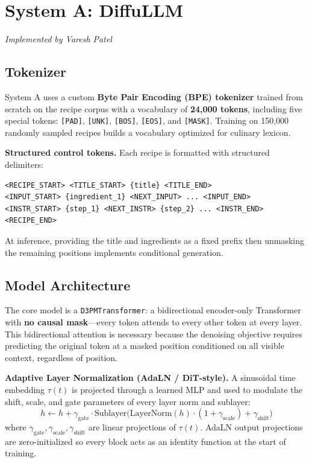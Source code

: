 \documentclass[11pt,a4paper]{article}
\begin{document}
\section{System A: DiffuLLM}

\textit{Implemented by Varesh Patel}

\subsection{Tokenizer}

System A uses a custom \textbf{Byte Pair Encoding (BPE) tokenizer} trained from scratch on the recipe corpus with a vocabulary of \textbf{24,000 tokens}, including five special tokens: \texttt{[PAD]}, \texttt{[UNK]}, \texttt{[BOS]}, \texttt{[EOS]}, and \texttt{[MASK]}. Training on 150,000 randomly sampled recipes builds a vocabulary optimized for culinary lexicon.

\textbf{Structured control tokens.} Each recipe is formatted with structured delimiters:
\begin{lstlisting}
<RECIPE_START> <TITLE_START> {title} <TITLE_END>
<INPUT_START> {ingredient_1} <NEXT_INPUT> ... <INPUT_END>
<INSTR_START> {step_1} <NEXT_INSTR> {step_2} ... <INSTR_END>
<RECIPE_END>
\end{lstlisting}
At inference, providing the title and ingredients as a fixed prefix then unmasking the remaining positions implements conditional generation.

\subsection{Model Architecture}

The core model is a \texttt{D3PMTransformer}: a bidirectional encoder-only Transformer with \textbf{no causal mask}---every token attends to every other token at every layer. This bidirectional attention is necessary because the denoising objective requires predicting the original token at a masked position conditioned on all visible context, regardless of position.

\textbf{Adaptive Layer Normalization (AdaLN / DiT-style).} A sinusoidal time embedding $\tau(t)$ is projected through a learned MLP and used to modulate the shift, scale, and gate parameters of every layer norm and sublayer:
\[
  h \leftarrow h + \gamma_\text{gate} \cdot \mathrm{Sublayer}\!\bigl(\mathrm{LayerNorm}(h)\cdot(1 + \gamma_\text{scale}) + \gamma_\text{shift}\bigr)
\]
where $\gamma_\text{gate}, \gamma_\text{scale}, \gamma_\text{shift}$ are linear projections of $\tau(t)$. AdaLN output projections are zero-initialized so every block acts as an identity function at the start of training.
\end{document}
